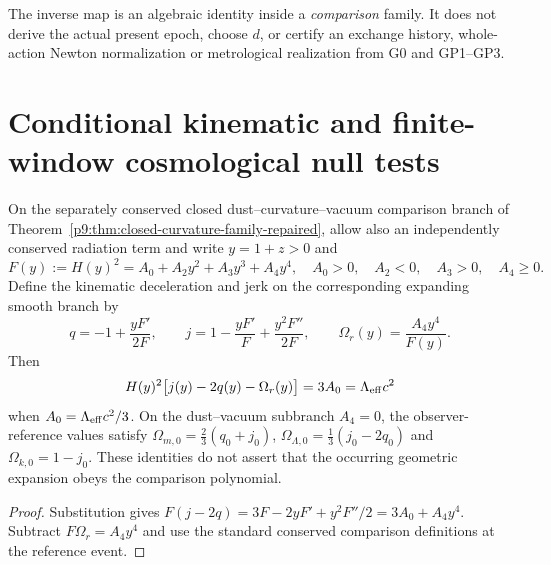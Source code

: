 \documentclass[12pt,a4paper]{article}
\begin{document}
\begin{remark}
\label{p9:rem:v356-inversion-not-occurrence}
The inverse map is an algebraic identity inside a \emph{comparison}
family.  It does not derive the actual present epoch, choose $d$, or
certify an exchange history, whole-action Newton normalization or
metrological realization from G0 and GP1--GP3.
\end{remark}


\section{Conditional kinematic and finite-window cosmological null tests}
\label{p9:sec:v358-observable-kinematic-tests}
\begin{proposition}
\label{p9:prop:v358-kinematic-null}
On the separately conserved closed dust--curvature--vacuum
comparison branch of Theorem~\ref{p9:thm:closed-curvature-family-repaired},
allow also an independently conserved radiation term and write
$y=1+z>0$ and
\[
 F(y):=H(y)^2=A_0+A_2y^2+A_3y^3+A_4y^4,
 \quad A_0>0,\quad A_2<0,\quad A_3>0,\quad A_4\ge0.
\]
Define the kinematic deceleration and jerk on the corresponding
expanding smooth branch by
\[
 q=-1+\frac{yF'}{2F},\qquad
 j=1-\frac{yF'}F+\frac{y^2F''}{2F},\qquad
 \Omega_r(y)=\frac{A_4y^4}{F(y)}.
\]
Then
\begin{equation}
\label{p9:eq:v358-kinematic-vacuum-null}
 H(y)^2\bigl[j(y)-2q(y)-\Omega_r(y)\bigr]
 =3A_0=\Lambda_{\rm eff}c^2
\end{equation}
when $A_0=\Lambda_{\rm eff}c^2/3$.  On the dust--vacuum
subbranch $A_4=0$, the observer-reference values satisfy
$\Omega_{m,0}=\frac23(q_0+j_0)$,
$\Omega_{\Lambda,0}=\frac13(j_0-2q_0)$ and
$\Omega_{k,0}=1-j_0$.
These identities do not assert that the occurring geometric
expansion obeys the comparison polynomial.
\end{proposition}
\begin{proof}
Substitution gives
$F(j-2q)=3F-2yF'+y^2F''/2=3A_0+A_4y^4$.
Subtract $F\Omega_r=A_4y^4$ and use the standard conserved
comparison definitions at the reference event.
\end{proof}
\end{document}
